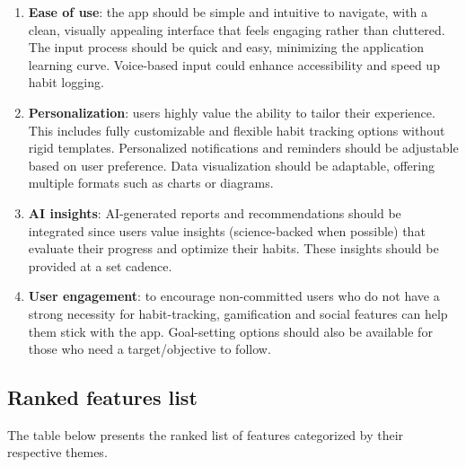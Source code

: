 \documentclass{article}
\begin{document}
\begin{enumerate}

	\item \textbf{Ease of use}: the app should be simple and intuitive to navigate, with a clean, visually appealing interface that feels engaging rather than cluttered. The input process should be quick and easy, minimizing the application learning curve. Voice-based input could enhance accessibility and speed up habit logging.

	\item \textbf{Personalization}: users highly value the ability to tailor their experience. This includes fully customizable and flexible habit tracking options without rigid templates. Personalized notifications and reminders should be adjustable based on user preference. Data visualization should be adaptable, offering multiple formats such as charts or diagrams.

	\item \textbf{AI insights}: AI-generated reports and recommendations should be integrated since users value insights (science-backed when possible) that evaluate their progress and optimize their habits. These insights should be provided at a set cadence.

	\item \textbf{User engagement}: to encourage non-committed users who do not have a strong necessity for habit-tracking, gamification and social features can help them stick with the app. Goal-setting options should also be available for those who need a target/objective to follow.

\end{enumerate}

\subsection{Ranked features list}

The table below presents the ranked list of features categorized by their respective themes.
\end{document}
